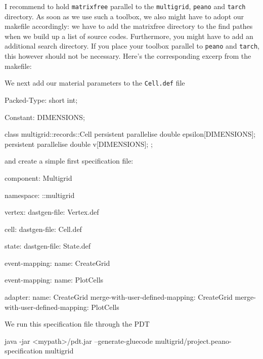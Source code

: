 \noindent
I recommend to hold \texttt{matrixfree} parallel to the \texttt{multigrid},
\texttt{peano} and \texttt{tarch} directory.
As soon as we use such a toolbox, we also might have to adopt our makefile
accordingly: we have to add the matrixfree directory to the find pathes when we
build up a list of source codes.
Furthermore, you might have to add an additional search directory. If you place
your toolbox parallel to \texttt{peano} and \texttt{tarch}, this however should
not be necessary.
Here's the corresponding excerp from the makefile:

\noindent
We next add our material parameters to the \texttt{Cell.def} file
\begin{code}
Packed-Type: short int;

Constant: DIMENSIONS;

class multigrid::records::Cell {  
  persistent parallelise double   epsilon[DIMENSIONS];
  persistent parallelise double   v[DIMENSIONS];
};
\end{code}

\noindent
and create a simple first specification file:
\begin{code}
component: Multigrid

namespace: ::multigrid

vertex:
  dastgen-file: Vertex.def
  
cell:
  dastgen-file: Cell.def

state:
  dastgen-file: State.def

event-mapping:
  name: CreateGrid

event-mapping:
  name: PlotCells

adapter:
  name: CreateGrid
  merge-with-user-defined-mapping: CreateGrid
  merge-with-user-defined-mapping: PlotCells
  
\end{code}

\noindent
We run this specification file through the PDT

\begin{code}
java -jar <mypath>/pdt.jar --generate-gluecode multigrid/project.peano-specification multigrid
\end{code}


